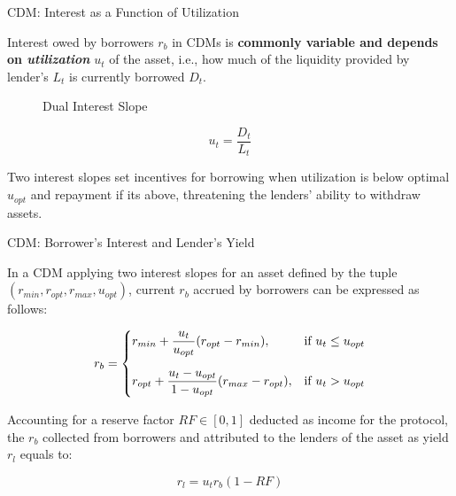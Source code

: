 \documentclass[]{beamer}
\begin{document}
\begin{frame}{CDM: Interest as a Function of Utilization }

Interest owed by borrowers $r_b$ in CDMs is \textbf{commonly variable and depends on \textit{utilization}} $u_t$ of the asset, i.e., how much of the liquidity provided by lender's $L_t$ is currently borrowed $D_t$.

\vspace{1.5em}

 {
\begin{minipage}{0.6\textwidth}
	\begin{figure}[t]
		\centering
		\begin{tikzpicture}[scale=0.5, every node/.style={scale=0.8}]
			
		\end{tikzpicture}
		\caption{Dual Interest Slope}
	\end{figure}
\end{minipage}
\begin{minipage}{0.38\textwidth}
	\vspace{-1em}
	\begin{equation*}
		u_t = \dfrac{D_t}{L_t}
	\end{equation*}
	
	\vspace{0.5 em}
	Two interest slopes set incentives for borrowing when utilization is below optimal $u_{opt}$ and repayment if its above, threatening the lenders' ability to withdraw assets.
	
\end{minipage}	
}

\end{frame}


\begin{frame}{CDM: Borrower's Interest and Lender's Yield }

In a CDM applying two interest slopes for an asset defined by the tuple $(r_{min}, r_{opt}, r_{max}, u_{opt})$, current $r_b$ accrued by borrowers can be expressed as follows:


\begin{equation*}
	r_b = 
		\begin{cases}
		r_{min} + \dfrac{u_t}{u_{opt}}(r_{opt}-r_{min}), & \text{if } u_t \leq u_{opt} \vspace{1em}\\
		r_{opt} + \dfrac{u_t-u_{opt}}{1-u_{opt}}(r_{max}-r_{opt}), & \text{if } u_t > u_{opt}
		\end{cases}
\end{equation*}

\vspace{1em}

 {
Accounting for a reserve factor $RF \in [0,1]$ deducted as income for the protocol, the $r_b$ collected from borrowers and attributed to the lenders of the asset as yield $r_l$ equals to:

\begin{equation*}
	r_l = u_t r_b (1-RF) 
\end{equation*}
}

\end{frame}
\end{document}

